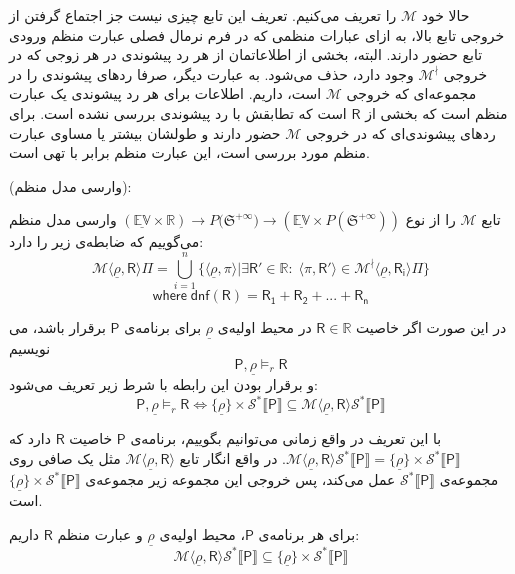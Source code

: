 حالا خود $\mathcal{M}$ را تعریف می‌کنیم. تعریف این تابع چیزی نیست جز اجتماع گرفتن از خروجی تابع بالا، به ازای عبارات منظمی که در فرم نرمال فصلی عبارت منظم ورودی تابع حضور دارند. البته، بخشی از اطلاعاتمان از هر رد پیشوندی در هر زوجی که در خروجی $\mathcal{M}^\nmid$ وجود دارد، حذف می‌شود. به عبارت دیگر، صرفا ردهای پیشوندی را در مجموعه‌ای که خروجی $\mathcal{M}$ است، داریم. اطلاعات برای هر رد پیشوندی یک عبارت منظم است که بخشی از $\mathsf{R}$ است که تطابقش با رد پیشوندی بررسی نشده است. برای ردهای پیشوندی‌ای که در خروجی $\mathcal{M}$ حضور دارند و طولشان بیشتر یا مساوی عبارت منظم مورد بررسی است، این عبارت منظم برابر با تهی است.

\begin{defn}
(وارسی مدل منظم):

تابع $\mathcal{M}$ را از نوع 
$\mathbb{(\underline{EV} \times R)} \rightarrow  \mathit{P}({\mathfrak{S}^{+\infty})}
\rightarrow (\mathbb{\underline{EV}} \times \mathit{P} (\mathfrak{S}^{+\infty} ) )$
 وارسی مدل منظم می‌گوییم که ضابطه‌ی زیر را دارد:
$$\mathcal{M} \langle \underline{\rho} , \mathsf{R} \rangle \Pi= \bigcup_{i=1}^n \{  \langle \underline{\rho},\pi\rangle | \exists \mathsf{R'} \in \mathbb{R}:\; \langle \pi , \mathsf{R'} \rangle \in 
\mathcal{M}^\nmid \langle \underline{\rho}, \mathsf{R_i} \rangle \Pi \}$$
$$\mathsf{where \; dnf (R) = R_1 + R_2 + ... + R_n}$$ 



در این صورت اگر خاصیت $\mathsf{R} \in \mathbb{R}$ در محیط اولیه‌ی $\underline{\rho}$ برای برنامه‌ی $\mathsf{P}$ برقرار باشد، می نویسیم
$$\mathsf{P} , \underline{\rho} \models_r \mathsf{R}$$
و برقرار بودن این رابطه با شرط زیر تعریف می‌شود:
$$\mathsf{P} , \underline{\rho} \models_r \mathsf{R} \iff \{\underline{\rho}\} \times \mathcal{S}^* \llbracket \mathsf{P} \rrbracket \subseteq \mathcal{M} \langle \underline{\rho} , \mathsf{R} \rangle \mathcal{S}^* \llbracket \mathsf{P} \rrbracket$$

\end{defn}

با این تعریف در واقع زمانی می‌توانیم بگوییم، برنامه‌ی $\mathsf{P}$ خاصیت $\mathsf{R}$ دارد \break که 
$\mathcal{M}\langle \underline{\rho} , \mathsf{R} \rangle \mathcal{S}^* \llbracket \mathsf{P} \rrbracket = 
\{\underline{\rho}\} \times \mathcal{S}^* \llbracket \mathsf{P} \rrbracket$.
در واقع انگار تابع 
$\mathcal{M} \langle \underline{\rho} , \mathsf{R} \rangle$
مثل یک صافی روی مجموعه‌ی 
$\mathcal{S}^* \llbracket \mathsf{P} \rrbracket$
عمل می‌کند، پس خروجی این مجموعه زیر مجموعه‌ی $\{\underline{\rho}\} \times \mathcal{S}^* \llbracket \mathsf{P} \rrbracket$ است.
\begin{thm}
	برای هر برنامه‌ی $\mathsf{P}$، محیط اولیه‌ی $\underline{\rho}$ و عبارت منظم $\mathsf{R}$ داریم:
	$$\mathcal{M}\langle \underline{\rho},\mathsf{R} \rangle \mathcal{S}^* \llbracket \mathsf{P} \rrbracket \subseteq \{\underline{\rho}\} \times \mathcal{S}^* \llbracket \mathsf{P}\rrbracket$$
\end{thm}

